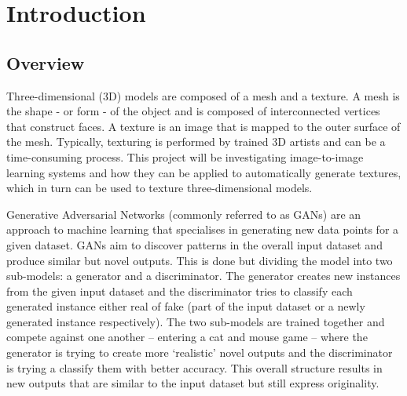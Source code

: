 \chapter{Introduction}
\label{ch:1introduction}


\section{Overview}
\label{sec:overview}
Three-dimensional (3D) models are composed of a mesh and a texture. A mesh is the shape - or form - of the object and is composed of interconnected vertices that construct faces. A texture is an image that is mapped to the outer surface of the mesh. Typically, texturing is performed by trained 3D artists and can be a time-consuming process. This project will be investigating image-to-image learning systems and how they can be applied to automatically generate textures, which in turn can be used to texture three-dimensional models.

\noindent Generative Adversarial Networks (commonly referred to as GANs) are an approach to machine learning that specialises in generating new data points for a given dataset. GANs aim to discover patterns in the overall input dataset and produce similar but novel outputs. This is done but dividing the model into two sub-models: a generator and a discriminator. The generator creates new instances from the given input dataset and the discriminator tries to classify each generated instance either real of fake (part of the input dataset or a newly generated instance respectively). The two sub-models are trained together and compete against one another – entering a cat and mouse game – where the generator is trying to create more ‘realistic’ novel outputs and the discriminator is trying a classify them with better accuracy. This overall structure results in new outputs that are similar to the input dataset but still express originality.

